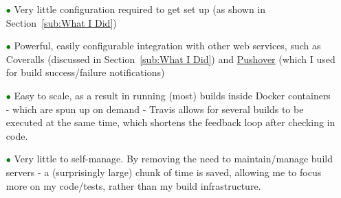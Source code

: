 \begin{itemize}
  \item[\textcolor{green}{$\bullet$}] Very little configuration required to get
  set up (as shown in Section~\ref{sub:What I Did})
  \item[\textcolor{green}{$\bullet$}] Powerful, easily configurable integration
  with other web services, such as Coveralls
  (discussed in Section~\ref{sub:What I Did}) and \href{https://pushover.net/}{Pushover}
  (which I used for build success/failure notifications)
  \item[\textcolor{green}{$\bullet$}] Easy to scale, as a result in running (most)
  builds inside Docker containers - which are spun up on demand - Travis allows
  for several builds to be executed at the same time, which shortens the feedback
  loop after checking in code.
  \item[\textcolor{green}{$\bullet$}] Very little to self-manage. By removing the
  need to maintain/manage build servers - a (surprisingly large) chunk of time is
  saved, allowing me to focus more on my code/tests, rather than my build infrastructure.
\end{itemize}
